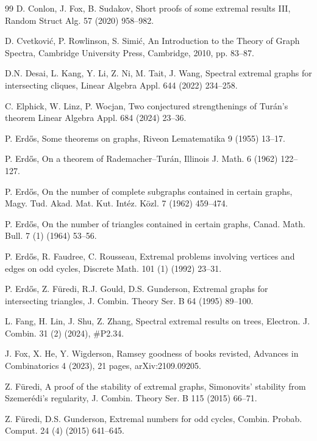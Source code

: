 \documentclass[11pt]{article}
\begin{document}
\begin{thebibliography}{99}
D. Conlon, J. Fox, B. Sudakov, 
Short proofs of some extremal results III,  
Random Struct Alg. 57 (2020) 958--982.  

D. Cvetkovi\'{c}, P. Rowlinson, S. Simi\'{c}, 
An Introduction to the Theory of Graph Spectra, 
Cambridge University Press, Cambridge, 2010, pp. 83--87. 

D.N. Desai, L. Kang, Y. Li, Z. Ni, M. Tait, J. Wang, 
Spectral extremal graphs for intersecting cliques, 
Linear Algebra Appl. 644 (2022) 234--258.  

C. Elphick, W. Linz, P. Wocjan, 
Two conjectured strengthenings of Tur\'{a}n's theorem
Linear Algebra Appl.  684 (2024) 23--36. 
 
P. Erd\H{o}s, Some theorems on graphs,
Riveon Lematematika 9 (1955) 13--17. 


P. Erd\H{o}s,
On a theorem of Rademacher--Tur\'{a}n,
Illinois J. Math. 6 (1962) 122--127. 


P. Erd\H{o}s, 
On the number of complete subgraphs contained in certain graphs, 
Magy. Tud. Akad. Mat. Kut. Int\'{e}z. K\"{o}zl. 7 (1962) 459--474. 


P. Erd\H{o}s,  
On the number of triangles contained in certain graphs, 
Canad. Math. Bull. 7 (1) (1964) 53--56.  
 
 P. Erd\H{o}s, R. Faudree, C. Rousseau, 
 Extremal problems involving vertices and 
 edges on odd cycles, 
Discrete Math. 101 (1) (1992) 23--31.

P. Erd{\H{o}}s, Z. F\"uredi, R.J. Gould, D.S. Gunderson,
Extremal graphs for intersecting triangles, 
J. Combin. Theory Ser. B 64 (1995) 89--100.

L. Fang, H. Lin, J. Shu, Z. Zhang, 
Spectral extremal results on trees, 
Electron. J. Combin. 31 (2) (2024), \#P2.34. 

 J. Fox, X. He, Y. Wigderson, 
 Ramsey goodness of books revisted, 
Advances in Combinatorics  4 (2023),  21 pages, 
arXiv:2109.09205. 
 
 
Z. F\"{u}redi,  
A proof of the stability of extremal graphs,  
Simonovits' stability from Szemer\'{e}di's regularity, 
 J. Combin. Theory Ser.  B 115 (2015) 66--71.  
 
Z. F\"{u}redi, D.S. Gunderson, 
Extremal numbers for odd cycles, 
Combin. Probab. Comput. 24 (4) (2015) 641--645.


\end{thebibliography}
\end{document}
